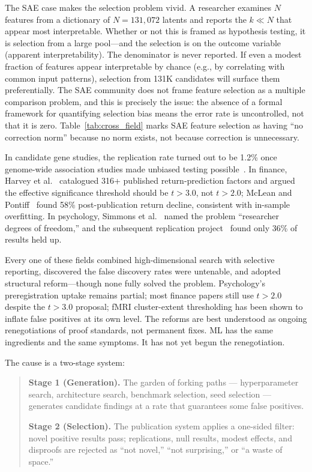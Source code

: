 \documentclass{article}
\begin{document}
The SAE case makes the selection problem vivid. A researcher examines $N$ features from a dictionary of $N = 131{,}072$ latents and reports the $k \ll N$ that appear most interpretable. Whether or not this is framed as hypothesis testing, it is selection from a large pool---and the selection is on the outcome variable (apparent interpretability). The denominator is never reported. If even a modest fraction of features appear interpretable by chance (e.g., by correlating with common input patterns), selection from 131K candidates will surface them preferentially. The SAE community does not frame feature selection as a multiple comparison problem, and this is precisely the issue: the absence of a formal framework for quantifying selection bias means the error rate is uncontrolled, not that it is zero. Table~\ref{tab:cross_field} marks SAE feature selection as having ``no correction norm'' because no norm exists, not because correction is unnecessary.

In candidate gene studies, the replication rate turned out to be 1.2\% once genome-wide association studies made unbiased testing possible~\citep{ioannidis_candidate_genes_2001}. In finance, Harvey et al.~\citep{harvey_factor_zoo_2016} catalogued 316+ published return-prediction factors and argued the effective significance threshold should be $t > 3.0$, not $t > 2.0$; McLean and Pontiff~\citep{mclean_pontiff_2016} found 58\% post-publication return decline, consistent with in-sample overfitting. In psychology, Simmons et al.~\citep{simmons_false_positive_2011} named the problem ``researcher degrees of freedom,'' and the subsequent replication project~\citep{nosek_replication_2015} found only 36\% of results held up.

Every one of these fields combined high-dimensional search with selective reporting, discovered the false discovery rates were untenable, and adopted structural reform---though none fully solved the problem. Psychology's preregistration uptake remains partial; most finance papers still use $t > 2.0$ despite the $t > 3.0$ proposal; fMRI cluster-extent thresholding has been shown to inflate false positives at its own level. The reforms are best understood as ongoing renegotiations of proof standards, not permanent fixes. ML has the same ingredients and the same symptoms. It has not yet begun the renegotiation.

The cause is a two-stage system:

\begin{quote}
\textbf{Stage 1 (Generation).} The garden of forking paths --- hyperparameter search, architecture search, benchmark selection, seed selection --- generates candidate findings at a rate that guarantees some false positives.

\textbf{Stage 2 (Selection).} The publication system applies a one-sided filter: novel positive results pass; replications, null results, modest effects, and disproofs are rejected as ``not novel,'' ``not surprising,'' or ``a waste of space.''
\end{quote}
\end{document}
